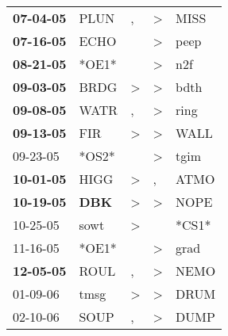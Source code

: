\begin{supertabular}{p{0.07\textwidth}p{0.06\textwidth}p{0.02\textwidth}p{0.02\textwidth}p{0.06\textwidth}}
 \textbf{07-04-05\textsuperscript{}} &           PLUN\textsuperscript{} &                , &     \textgreater &           MISS\textsuperscript{} \\
 \textbf{07-16-05\textsuperscript{}} &           ECHO\textsuperscript{} &                  &     \textgreater &           peep\textsuperscript{} \\
 \textbf{08-21-05\textsuperscript{}} &                            *OE1* &                  &     \textgreater &            n2f\textsuperscript{} \\
 \textbf{09-03-05\textsuperscript{}} &           BRDG\textsuperscript{} &     \textgreater &     \textgreater &           bdth\textsuperscript{} \\
 \textbf{09-08-05\textsuperscript{}} &           WATR\textsuperscript{} &                , &     \textgreater &           ring\textsuperscript{} \\
 \textbf{09-13-05\textsuperscript{}} &            FIR\textsuperscript{} &     \textgreater &     \textgreater &           WALL\textsuperscript{} \\
          09-23-05\textsuperscript{} &                            *OS2* &                  &     \textgreater &           tgim\textsuperscript{} \\
 \textbf{10-01-05\textsuperscript{}} &           HIGG\textsuperscript{} &     \textgreater &                , &           ATMO\textsuperscript{} \\
 \textbf{10-19-05\textsuperscript{}} &   \textbf{DBK\textsuperscript{}} &     \textgreater &     \textgreater &           NOPE\textsuperscript{} \\
          10-25-05\textsuperscript{} &           sowt\textsuperscript{} &     \textgreater &                  &                            *CS1* \\
          11-16-05\textsuperscript{} &                            *OE1* &                  &     \textgreater &           grad\textsuperscript{} \\
 \textbf{12-05-05\textsuperscript{}} &           ROUL\textsuperscript{} &                , &     \textgreater &           NEMO\textsuperscript{} \\
          01-09-06\textsuperscript{} &           tmsg\textsuperscript{} &     \textgreater &     \textgreater &           DRUM\textsuperscript{} \\
          02-10-06\textsuperscript{} &           SOUP\textsuperscript{} &                , &     \textgreater &           DUMP\textsuperscript{} \\

\end{supertabular}
